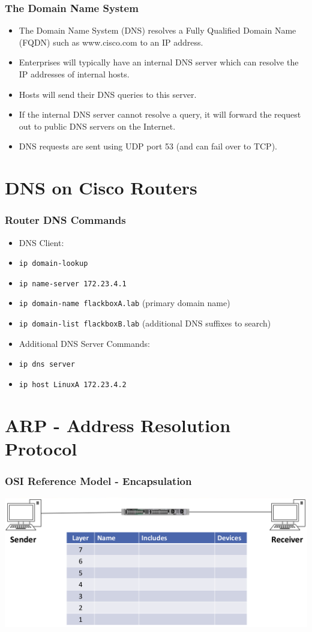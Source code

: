 \documentclass[pdflatex,compress,mathserif]{beamer}
\begin{document}
\begin{frame}
	\frametitle{The Domain Name System}
	\begin{itemize}
		\item The Domain Name System (DNS) resolves a Fully Qualified Domain Name (FQDN) such as www.cisco.com to an IP address.
		\item Enterprises will typically have an internal DNS server which can resolve the IP addresses of internal hosts.
		\item Hosts will send their DNS queries to this server.
		\item If the internal DNS server cannot resolve a query, it will forward the request out to public DNS servers on the Internet.
		\item DNS requests are sent using UDP port 53 (and can fail over to TCP).
	\end{itemize}
\end{frame}

\section{DNS on Cisco Routers}

\begin{frame}
	\frametitle{Router DNS Commands}
	\begin{itemize}
		\item DNS Client:
		\item[] \texttt{ip domain-lookup}
		\item[] \texttt{ip name-server 172.23.4.1}
		\item[] \texttt{ip domain-name flackboxA.lab} (primary domain name)
		\item[] \texttt{ip domain-list flackboxB.lab} (additional DNS suffixes to search)
		\item Additional DNS Server Commands:
		\item[] \texttt{ip dns server}
		\item[] \texttt{ip host LinuxA 172.23.4.2}
	\end{itemize}
\end{frame}

\section{ARP - Address Resolution Protocol}

\begin{frame}
	\frametitle{OSI Reference Model - Encapsulation}
	\begin{center}
		\includegraphics[width=\linewidth]{img/img01}
	\end{center}
\end{frame}
\end{document}
